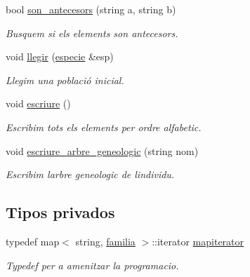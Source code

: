 \begin{DoxyCompactItemize}
bool \hyperlink{classpoblacio_a0002a245d187017cf1af34b364c176a0}{son\+\_\+antecesors} (string a, string b)
\begin{DoxyCompactList}\small\item\em Busquem si els elements son antecesors. \end{DoxyCompactList}\item 
void \hyperlink{classpoblacio_a02fda63e8b0144ce197764753778a201}{llegir} (\hyperlink{classespecie}{especie} \&esp)
\begin{DoxyCompactList}\small\item\em Llegim una població inicial. \end{DoxyCompactList}\item 
void \hyperlink{classpoblacio_aef82aca848d299bc5eff6d6b479a5081}{escriure} ()
\begin{DoxyCompactList}\small\item\em Escribim tots els elements per ordre alfabetic. \end{DoxyCompactList}\item 
void \hyperlink{classpoblacio_a30e1c829999a403012ce09172461d656}{escriure\+\_\+arbre\+\_\+geneologic} (string nom)
\begin{DoxyCompactList}\small\item\em Escribim l\textquotesingle{}arbre geneologic de l\textquotesingle{}individu. \end{DoxyCompactList}\end{DoxyCompactItemize}
\subsection*{Tipos privados}
\begin{DoxyCompactItemize}
\item 
typedef map$<$ string, \hyperlink{structpoblacio_1_1familia}{familia} $>$\+::iterator \hyperlink{classpoblacio_a52c3d96b08f7679f27487e7499185ed1}{mapiterator}
\begin{DoxyCompactList}\small\item\em Typedef per a amenitzar la programacio. \end{DoxyCompactList}\end{DoxyCompactItemize}

